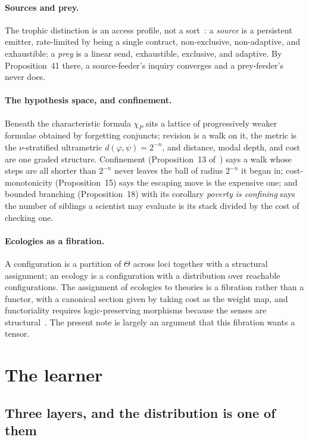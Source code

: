 \documentclass[11pt,a4paper]{article}
\theoremstyle{plain}
\theoremstyle{definition}
\theoremstyle{remark}
\begin{document}
\paragraph{Sources and prey.}
The trophic distinction is an access profile, not a sort~\cite[\S11.2]{scientist}: a
\emph{source} is a persistent emitter, rate-limited by being a single contract, non-exclusive,
non-adaptive, and exhaustible; a \emph{prey} is a linear send, exhaustible, exclusive, and
adaptive. By Proposition~41 there, a source-feeder's inquiry converges and a prey-feeder's never
does.

\paragraph{The hypothesis space, and confinement.}
Beneath the characteristic formula $\chi_P$ sits a lattice of progressively weaker formulae
obtained by forgetting conjuncts; revision is a walk on it, the metric is the $\nu$-stratified
ultrametric $d(\varphi,\psi) = 2^{-n}$, and distance, modal depth, and cost are one graded
structure. Confinement (Proposition~13 of~\cite{scientist}) says a walk whose steps are all
shorter than $2^{-n}$ never leaves the ball of radius $2^{-n}$ it began in; cost-monotonicity
(Proposition~15) says the escaping move is the expensive one; and bounded branching
(Proposition~18) with its corollary \emph{poverty is confining} says the number of siblings a
scientist may evaluate is its stack divided by the cost of checking one.

\paragraph{Ecologies as a fibration.}
A configuration is a partition of $\Theta$ across loci together with a structural assignment; an
ecology is a configuration with a distribution over reachable configurations. The assignment of
ecologies to theories is a fibration rather than a functor, with a canonical section given by
taking cost as the weight map, and functoriality requires logic-preserving morphisms because the
senses are structural~\cite[\S15]{scientist}. The present note is largely an argument that this
fibration wants a tensor.

\section{The learner}\label{sec:learner}

\subsection{Three layers, and the distribution is one of them}
\end{document}
